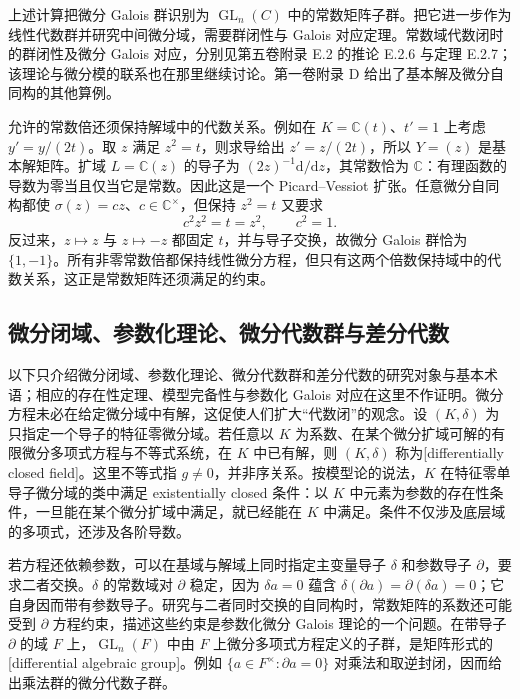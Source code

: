 上述计算把微分 Galois 群识别为 \(\operatorname{GL}_n(C)\) 中的常数矩阵子群。把它进一步作为线性代数群并研究中间微分域，需要群闭性与 Galois 对应定理。常数域代数闭时的群闭性及微分 Galois 对应，分别见第五卷附录 E.2 的推论 E.2.6 与定理 E.2.7；该理论与微分模的联系也在那里继续讨论。第一卷附录 D 给出了基本解及微分自同构的其他算例。

\ProseParagraphBreak
允许的常数倍还须保持解域中的代数关系。例如在 \(K=\mathbb C(t)\)、\(t'=1\) 上考虑 \(y'=y/(2t)\)。取 \(z\) 满足 \(z^2=t\)，则求导给出 \(z'=z/(2t)\)，所以 \(Y=(z)\) 是基本解矩阵。扩域 \(L=\mathbb C(z)\) 的导子为 \((2z)^{-1}\mathrm{d}/\mathrm{d}z\)，其常数恰为 \(\mathbb C\)：有理函数的导数为零当且仅当它是常数。因此这是一个 Picard--Vessiot 扩张。任意微分自同构都使 \(\sigma(z)=cz\)、\(c\in\mathbb C^\times\)，但保持 \(z^2=t\) 又要求
\[
	c^2z^2=t=z^2,\qquad c^2=1.
\]
反过来，\(z\mapsto z\) 与 \(z\mapsto-z\) 都固定 \(t\)，并与导子交换，故微分 Galois 群恰为 \(\{1,-1\}\)。所有非零常数倍都保持线性微分方程，但只有这两个倍数保持域中的代数关系，这正是常数矩阵还须满足的约束。

\subsection{微分闭域、参数化理论、微分代数群与差分代数}
\label{b3:subsec:E04:02}

以下只介绍微分闭域、参数化理论、微分代数群和差分代数的研究对象与基本术语；相应的存在性定理、模型完备性与参数化 Galois 对应在这里不作证明。微分方程未必在给定微分域中有解，这促使人们扩大“代数闭”的观念。设 \((K,\delta)\) 为只指定一个导子的特征零微分域。若任意以 \(K\) 为系数、在某个微分扩域可解的有限微分多项式方程与不等式系统，在 \(K\) 中已有解，则 \((K,\delta)\) 称为[differentially closed field]。这里不等式指 \(g\ne0\)，并非序关系。按模型论的说法，\(K\) 在特征零单导子微分域的类中满足 existentially closed 条件：以 \(K\) 中元素为参数的存在性条件，一旦能在某个微分扩域中满足，就已经能在 \(K\) 中满足。条件不仅涉及底层域的多项式，还涉及各阶导数。

\ProseParagraphBreak
若方程还依赖参数，可以在基域与解域上同时指定主变量导子 \(\delta\) 和参数导子 \(\partial\)，要求二者交换。\(\delta\) 的常数域对 \(\partial\) 稳定，因为 \(\delta a=0\) 蕴含 \(\delta(\partial a)=\partial(\delta a)=0\)；它自身因而带有参数导子。研究与二者同时交换的自同构时，常数矩阵的系数还可能受到 \(\partial\) 方程约束，描述这些约束是参数化微分 Galois 理论的一个问题。在带导子 \(\partial\) 的域 \(F\) 上，\(\operatorname{GL}_n(F)\) 中由 \(F\) 上微分多项式方程定义的子群，是矩阵形式的[differential algebraic group]。例如 \(\{a\in F^\times:\partial a=0\}\) 对乘法和取逆封闭，因而给出乘法群的微分代数子群。

